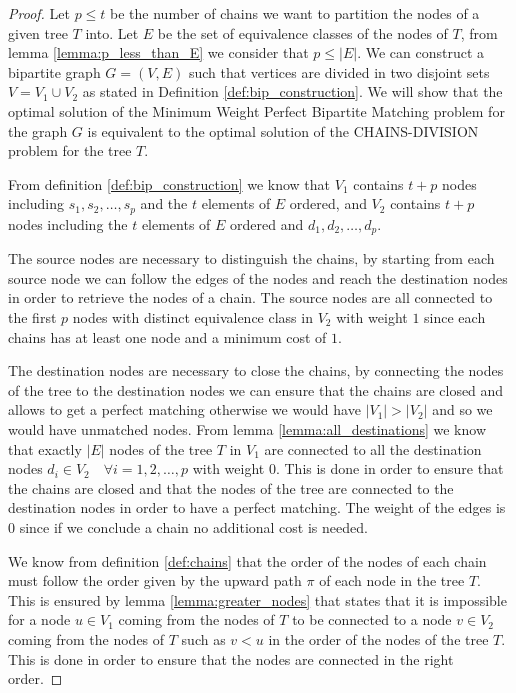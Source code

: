 \begin{proof}
    Let $p \leq t$ be the number of chains we want to partition the nodes of a given tree $T$ into. Let $E$ be the set of equivalence classes of the nodes of $T$, from lemma \ref{lemma:p_less_than_E} we consider that $p \leq |E|$. We can construct a bipartite graph $G = (V, E)$ such that vertices are divided in two disjoint sets $V = V_1 \cup V_2$ as stated in Definition \ref{def:bip_construction}. We will show that the optimal solution of the Minimum Weight Perfect Bipartite Matching problem for the graph $G$ is equivalent to the optimal solution of the \textsc{CHAINS-DIVISION} problem for the tree $T$.

    From definition \ref{def:bip_construction} we know that $V_1$ contains $t + p$ nodes including $s_1, s_2, \dots, s_p$ and the $t$ elements of $E$ ordered, and $V_2$ contains $t + p$ nodes including the $t$ elements of $E$ ordered and $d_1, d_2, \dots, d_p$. 

    The source nodes are necessary to distinguish the chains, by starting from each source node we can follow the edges of the nodes and reach the destination nodes in order to retrieve the nodes of a chain. The source nodes are all connected to the first $p$ nodes with distinct equivalence class in $V_2$ with weight $1$ since each chains has at least one node and a minimum cost of $1$.
    
    The destination nodes are necessary to close the chains, by connecting the nodes of the tree to the destination nodes we can ensure that the chains are closed and allows to get a perfect matching otherwise we would have $|V_1| > |V_2|$ and so we would have unmatched nodes. From lemma \ref{lemma:all_destinations} we know that exactly $|E|$ nodes of the tree $T$ in $V_1$ are connected to all the destination nodes $d_i \in V_2 \quad \forall i = 1, 2, \dots, p$ with weight $0$. This is done in order to ensure that the chains are closed and that the nodes of the tree are connected to the destination nodes in order to have a perfect matching. The weight of the edges is $0$ since if we conclude a chain no additional cost is needed.

    We know from definition \ref{def:chains} that the order of the nodes of each chain must follow the order given by the upward path $\pi$ of each node in the tree $T$. This is ensured by lemma \ref{lemma:greater_nodes} that states that it is impossible for a node $u \in V_1$ coming from the nodes of $T$ to be connected to a node $v \in V_2$ coming from the nodes of $T$ such as $v < u$ in the order of the nodes of the tree $T$. This is done in order to ensure that the nodes are connected in the right order.


\end{proof}
